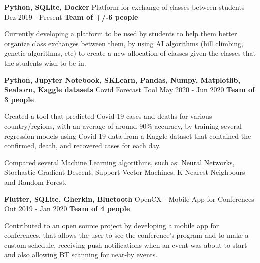
\begin{cventries}

  \cventry
    {\textbf{Python, SQLite, Docker}}
    {Platform for exchange of classes between students}
    {Dez 2019 - Present}
    {\textbf{Team of +/-6 people}}
    {
      \begin{cvitems} %
        \item {Currently developing a platform to be used by students to help them better organize class exchanges between them, by using AI algorithms (hill climbing, genetic algorithms, etc) to create a new allocation of classes given the classes that the students wish to be in.}
      \end{cvitems}
    }

  \cventry
    {\textbf{Python, Jupyter Notebook, SKLearn, Pandas, Numpy, Matplotlib, Seaborn, Kaggle datasets}} %
    {Covid Forecast Tool \href{https://github.com/EduRibeiro00/CovidForecast-feup-iart}{\faExternalLink}} %
    {May 2020 - Jun 2020} %
    {\textbf{Team of 3 people}} %
    {
      \begin{cvitems} %
        \item {Created a tool that predicted Covid-19 cases and deaths for various country/regions, with an average of around 90\% accuracy, by training several regression models using Covid-19 data from a Kaggle dataset that contained the confirmed, death, and recovered cases for each day.}
        \item {Compared several Machine Learning algorithms, such as: Neural Networks, Stochastic Gradient Descent, Support Vector Machines, K-Nearest Neighbours and Random Forest.}
      \end{cvitems}
    }

  \cventry
    {\textbf{Flutter, SQLite, Gherkin, Bluetooth}} %
    {OpenCX - Mobile App for Conferences \href{https://github.com/open-cx/open-cx}{\faExternalLink}} %
    {Out 2019 - Jan 2020} %
    {\textbf{Team of 4 people}} %
    {
      \begin{cvitems} %
        \item {Contributed to an open source project by developing a mobile app for conferences, that allows the user to see the conference's program and to make a custom schedule, receiving push notifications when an event was about to start and also allowing BT scanning for near-by events.}
      \end{cvitems}
    }


\end{cventries}

